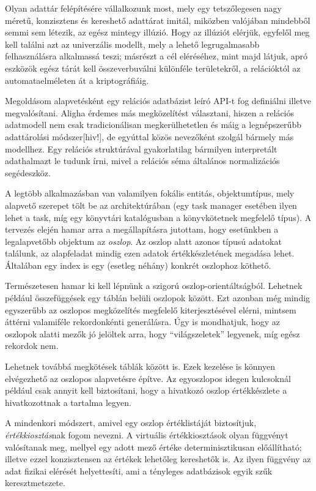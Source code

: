 \documentclass[
    parspace,
    noindent,
    nohyp,
]{elteiktdk}[2023/04/10]
\begin{document}
Olyan adattár felépítésére vállalkozunk most,
mely egy tetszőlegesen nagy méretű, konzisztens és kereshető adattárat imitál,
miközben valójában mindebből semmi sem létezik,
az egész mintegy illúzió.
Hogy az illúziót elérjük, egyfelől meg kell találni azt az univerzális modellt,
mely a lehető legrugalmasabb felhasználásra alkalmassá teszi;
másrészt a cél eléréséhez, mint majd látjuk, apró eszközök egész tárát kell összeverbuválni
különféle területekről, a relációktól az automataelméleten át a kriptográfiáig.

Megoldásom alapvetésként egy relációs adatbázist leíró API-t fog definiálni illetve megvalósítani.
Aligha érdemes más megközelítést választani,
hiszen a relációs adatmodell nem csak tradicionálisan megkerülhetetlen
és máig a legnépszerűbb adattárolási módszer[hiv!],
de egyúttal közös nevezőként szolgál bármely más modellhez.
Egy relációs struktúrával gyakorlatilag bármilyen interpretált adathalmazt le tudunk írni,
mivel a relációs séma általános normalizációs segédeszköz.

A legtöbb alkalmazásban van valamilyen fokális entitás, objektumtípus,
mely alapvető szerepet tölt be az architektúrában
(egy task manager esetében ilyen lehet a task,
míg egy könyvtári katalógusban a könyvkötetnek megfelelő típus).
A tervezés elején hamar arra a megállapításra jutottam,
hogy esetünkben a legalapvetőbb objektum az \textit{oszlop}.
Az oszlop alatt azonos típusú adatokat találunk,
az alapfeladat mindig ezen adatok értékkészletének megadása lehet.
Általában egy index is egy (esetleg néhány) konkrét oszlophoz köthető.

Természetesen hamar ki kell lépnünk a szigorú oszlop-orientáltságból.
Lehetnek például összefüggések egy táblán belüli oszlopok között.
Ezt azonban még mindig egyszerűbb az oszlopos megközelítés megfelelő kiterjesztésével elérni,
mintsem áttérni valamiféle rekordonkénti generálásra.
Úgy is mondhatjuk, hogy az oszlopok alatti mezők jó jelöltek arra, hogy ``világszeletek'' legyenek,
míg egész rekordok nem.

Lehetnek továbbá megkötések táblák között is.
Ezek kezelése is könnyen elvégezhető az oszlopos alapvetésre építve.
Az egyoszlopos idegen kulcsoknál például csak annyit kell biztosítani,
hogy a hivatkozó oszlop értékkészlete a hivatkozottnak a tartalma legyen.

A mindenkori módszert, amivel egy oszlop értéklistáját biztosítjuk,
\textit{értékkiosztás}nak fogom nevezni.
A virtuális értékkiosztások olyan függvényt valósítanak meg,
mellyel egy adott mező értéke determinisztikusan előállítható;
illetve ezzel konzisztensen az értékek lehetőleg kereshetők is.
Az ilyen függvény az adat fizikai elérését helyettesíti,
ami a tényleges adatbázisok egyik szűk keresztmetszete.
\end{document}
